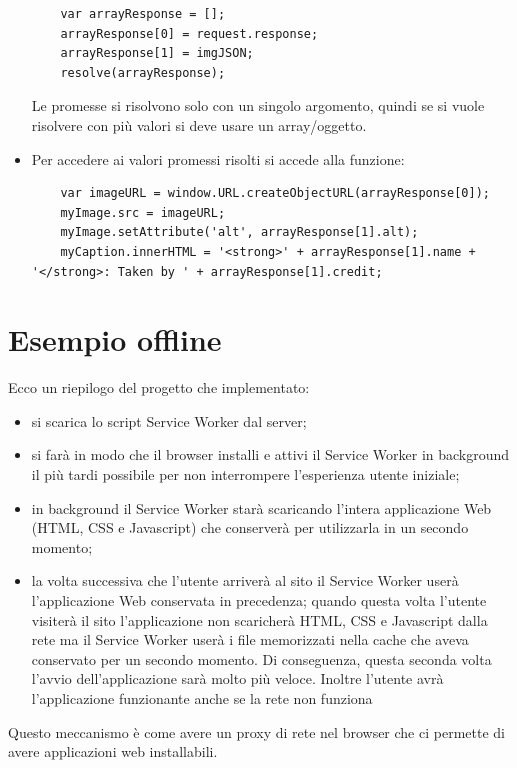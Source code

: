 \documentclass[italian]{article}
\begin{document}
\begin{itemize}
\begin{lstlisting}
	var arrayResponse = [];
	arrayResponse[0] = request.response;
	arrayResponse[1] = imgJSON;
	resolve(arrayResponse);
\end{lstlisting}
Le promesse si risolvono solo con un singolo argomento, quindi se si vuole risolvere con più valori si deve usare un array/oggetto.
\item Per accedere ai valori promessi risolti si accede alla funzione:
\begin{lstlisting}
	var imageURL = window.URL.createObjectURL(arrayResponse[0]);	
	myImage.src = imageURL;
	myImage.setAttribute('alt', arrayResponse[1].alt);
	myCaption.innerHTML = '<strong>' + arrayResponse[1].name + '</strong>: Taken by ' + arrayResponse[1].credit;
\end{lstlisting}

\end{itemize}
\pagebreak
\section{Esempio offline}
Ecco un riepilogo del progetto che implementato:
\begin{itemize}
\item si scarica lo script Service Worker dal server;
\item si farà in modo che il browser installi e attivi il Service Worker in background il più tardi possibile per non interrompere l'esperienza utente iniziale;
\item in background il Service Worker starà scaricando l'intera applicazione Web (HTML, CSS e Javascript) che conserverà per utilizzarla in un secondo momento;
\item la volta successiva che l'utente arriverà al sito il Service Worker userà l'applicazione Web conservata in precedenza; quando questa volta l'utente visiterà il sito l'applicazione non scaricherà HTML, CSS e Javascript dalla rete ma il Service Worker userà i file memorizzati nella cache che aveva conservato per un secondo momento. Di conseguenza, questa seconda volta l'avvio dell'applicazione sarà molto più veloce. Inoltre l'utente avrà l'applicazione funzionante anche se la rete non funziona
\end{itemize}

Questo  meccanismo è come avere un proxy di rete nel browser che ci permette di avere applicazioni web installabili.
\end{document}
